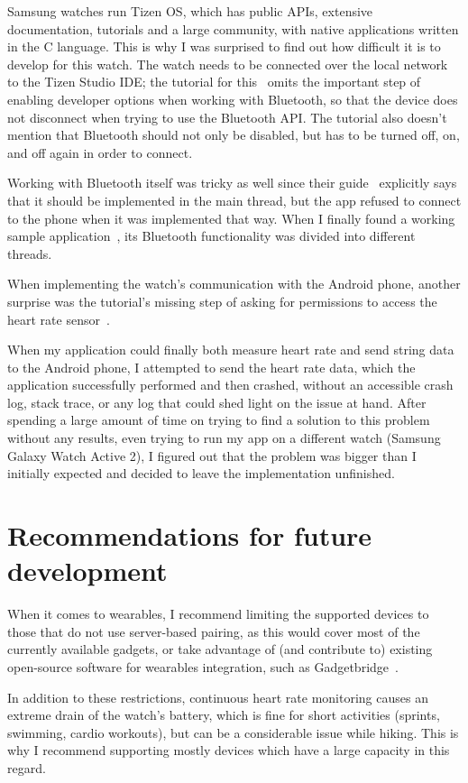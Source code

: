 Samsung watches run Tizen OS, which has public APIs, extensive documentation, tutorials and a large community, with native applications written in the C language.
This is why I was surprised to find out how difficult it is to develop for this watch.
The watch needs to be connected over the local network to the Tizen Studio IDE;
the tutorial for this~\cite{tizen_connect_tutorial} omits the important step of enabling developer options when working with Bluetooth,
so that the device does not disconnect when trying to use the Bluetooth API.
The tutorial also doesn't mention that Bluetooth should not only be disabled, but has to be turned off, on, and off again in order to connect.

Working with Bluetooth itself was tricky as well since their guide~\cite{tizen_bluetooth_guide} explicitly says that it should be implemented in the main thread,
but the app refused to connect to the phone when it was implemented that way.
When I finally found a working sample application~\cite{tizen_bluetooth_sample}, its Bluetooth functionality was divided into different threads.

When implementing the watch's communication with the Android phone, another surprise was the tutorial's missing step of asking for permissions to access the heart rate sensor~\cite{tizen_sensor_tutorial}.

When my application could finally both measure heart rate and send string data to the Android phone, I attempted to send the heart rate data,
which the application successfully performed and then crashed, without an accessible crash log, stack trace, or any log that could shed light on the issue at hand.
After spending a large amount of time on trying to find a solution to this problem without any results, even trying to run my app on a different watch (Samsung Galaxy Watch Active 2), I figured out that the problem was bigger than I initially expected and decided to leave the implementation unfinished.

\section{Recommendations for future development}
When it comes to wearables, I recommend limiting the supported devices to those that do not use server-based pairing, as this would cover most of the currently available gadgets,
or take advantage of (and contribute to) existing open-source software for wearables integration, such as Gadgetbridge~\cite{Gadgetbridge}.

In addition to these restrictions, continuous heart rate monitoring causes an extreme drain of the watch's battery,
which is fine for short activities (sprints, swimming, cardio workouts), but can be a considerable issue while hiking.
This is why I recommend supporting mostly devices which have a large capacity in this regard.
